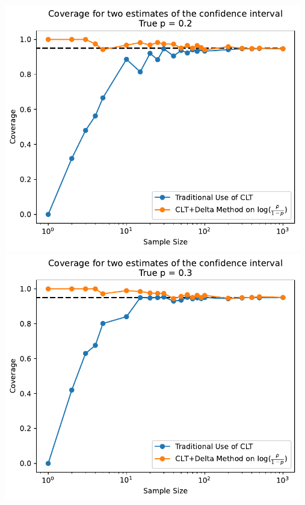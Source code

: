 \documentclass{article}
\begin{document}
\includegraphics[width=13cm]{plot_3.pdf}
\includegraphics[width=13cm]{plot_4.pdf}

\newpage
\end{document}
